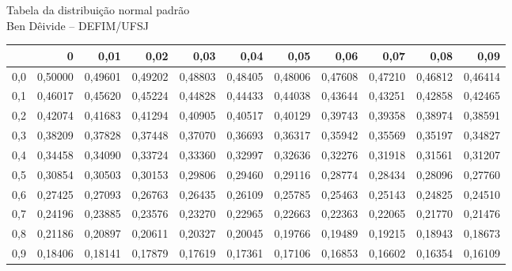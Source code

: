 \documentclass[a4paper]{article}
\begin{document}

 
\begin{center}
{\Large Tabela da distribui\c{c}\~{a}o normal padr\~{a}o}\\ \vspace{2ex}
{\large Ben D\^eivide -- DEFIM/UFSJ}  \\
\end{center}
 
 
 
\begin{center}
\end{center}
 
\begin{center}
\small\addtolength{\tabcolsep}{-3pt}
{\footnotesize
\begin{tabular}{rrrrrrrrrrr}
  \hline
 & 0 & 0,01 & 0,02 & 0,03 & 0,04 & 0,05 & 0,06 & 0,07 & 0,08 & 0,09 \\ 
  \hline
0,0 & 0,50000 & 0,49601 & 0,49202 & 0,48803 & 0,48405 & 0,48006 & 0,47608 & 0,47210 & 0,46812 & 0,46414 \\ 
  0,1 & 0,46017 & 0,45620 & 0,45224 & 0,44828 & 0,44433 & 0,44038 & 0,43644 & 0,43251 & 0,42858 & 0,42465 \\ 
  0,2 & 0,42074 & 0,41683 & 0,41294 & 0,40905 & 0,40517 & 0,40129 & 0,39743 & 0,39358 & 0,38974 & 0,38591 \\ 
  0,3 & 0,38209 & 0,37828 & 0,37448 & 0,37070 & 0,36693 & 0,36317 & 0,35942 & 0,35569 & 0,35197 & 0,34827 \\ 
  0,4 & 0,34458 & 0,34090 & 0,33724 & 0,33360 & 0,32997 & 0,32636 & 0,32276 & 0,31918 & 0,31561 & 0,31207 \\ 
  0,5 & 0,30854 & 0,30503 & 0,30153 & 0,29806 & 0,29460 & 0,29116 & 0,28774 & 0,28434 & 0,28096 & 0,27760 \\ 
  0,6 & 0,27425 & 0,27093 & 0,26763 & 0,26435 & 0,26109 & 0,25785 & 0,25463 & 0,25143 & 0,24825 & 0,24510 \\ 
  0,7 & 0,24196 & 0,23885 & 0,23576 & 0,23270 & 0,22965 & 0,22663 & 0,22363 & 0,22065 & 0,21770 & 0,21476 \\ 
  0,8 & 0,21186 & 0,20897 & 0,20611 & 0,20327 & 0,20045 & 0,19766 & 0,19489 & 0,19215 & 0,18943 & 0,18673 \\ 
  0,9 & 0,18406 & 0,18141 & 0,17879 & 0,17619 & 0,17361 & 0,17106 & 0,16853 & 0,16602 & 0,16354 & 0,16109 \\ 

\end{tabular}}
\end{center}
\end{document}
